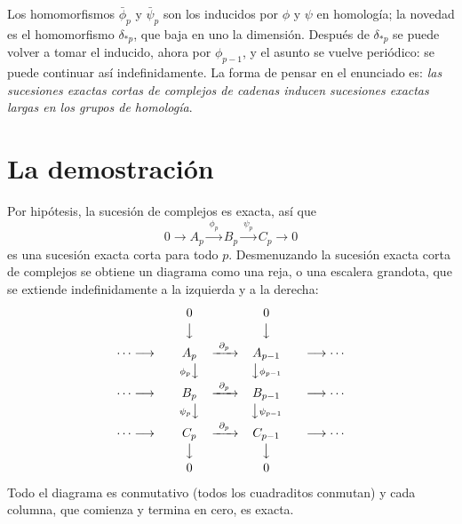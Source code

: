 \documentclass[11pt]{article}
\begin{document}
Los homomorfismos $\bar\phi_p$ y $\bar\psi_p$ son los inducidos por $\phi$ y $\psi$ en homología; la novedad es el homomorfismo $\delta_{*p}$, que baja en uno la dimensión. Después de $\delta_{*p}$ se puede volver a tomar el inducido, ahora por $\phi_{p-1}$, y el asunto se vuelve periódico: se puede continuar así indefinidamente. La forma de pensar en el enunciado es: \emph{las sucesiones exactas cortas de complejos de cadenas inducen sucesiones exactas largas en los grupos de homología}.

\section*{La demostración}

Por hipótesis, la sucesión de complejos es exacta, así que
\[
  0\longrightarrow A_p\xrightarrow{\ \phi_p\ }B_p\xrightarrow{\ \psi_p\ }C_p\longrightarrow0
\]
es una sucesión exacta corta para todo $p$. Desmenuzando la sucesión exacta corta de complejos se obtiene un diagrama como una reja, o una escalera grandota, que se extiende indefinidamente a la izquierda y a la derecha:
\[
  \begin{array}{ccccccc}
    & & 0 & & 0 & & \\[2pt]
    & & \big\downarrow & & \big\downarrow & & \\[2pt]
    \cdots\longrightarrow & & A_p & \xrightarrow{\ \partial_p\ } & A_{p-1} & & \longrightarrow\cdots\\[2pt]
    & & {\scriptstyle\phi_p}\big\downarrow & & \big\downarrow{\scriptstyle\phi_{p-1}} & & \\[2pt]
    \cdots\longrightarrow & & B_p & \xrightarrow{\ \partial_p\ } & B_{p-1} & & \longrightarrow\cdots\\[2pt]
    & & {\scriptstyle\psi_p}\big\downarrow & & \big\downarrow{\scriptstyle\psi_{p-1}} & & \\[2pt]
    \cdots\longrightarrow & & C_p & \xrightarrow{\ \partial_p\ } & C_{p-1} & & \longrightarrow\cdots\\[2pt]
    & & \big\downarrow & & \big\downarrow & & \\[2pt]
    & & 0 & & 0 & &
  \end{array}
\]
Todo el diagrama es conmutativo (todos los cuadraditos conmutan) y cada columna, que comienza y termina en cero, es exacta.
\end{document}
